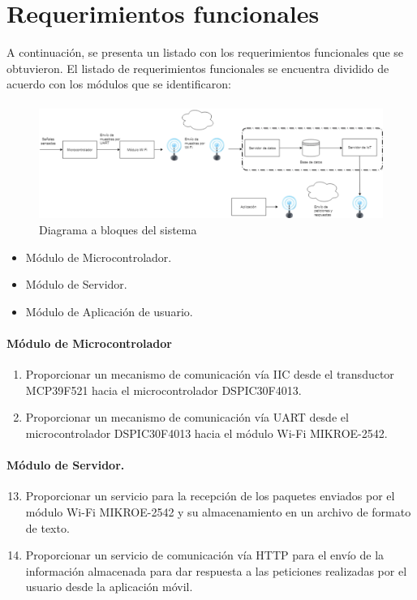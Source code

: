 \section{Requerimientos funcionales}
A continuación, se presenta un listado con los requerimientos funcionales que se obtuvieron.
El listado de requerimientos funcionales se encuentra dividido de acuerdo con los módulos que se identificaron:

\paragraph{}
\begin{figure}[H]
	\centering
	\includegraphics[scale=.3]{Capitulo3/img/diagramaBloques.png}
	\caption{Diagrama a bloques del sistema}
	\label{fig:diagrama_dispMonitoreo}
\end{figure}

\begin{itemize}
	\item Módulo de Microcontrolador.
	\item Módulo de Servidor.
	\item Módulo de Aplicación de usuario.
\end{itemize}

\paragraph{Módulo de Microcontrolador}
\begin{enumerate}[label=RF\arabic*.]
	\item Proporcionar un mecanismo de comunicación vía IIC desde el transductor MCP39F521 hacia el microcontrolador DSPIC30F4013.
	\item Proporcionar un mecanismo de comunicación vía UART desde el microcontrolador DSPIC30F4013 hacia el módulo Wi-Fi MIKROE-2542.
\end{enumerate}

\paragraph{Módulo de Servidor.}
\begin{enumerate}[label=RF\arabic*.]
	\setcounter{enumi}{12}
	\item Proporcionar un servicio para la recepción de los paquetes enviados por el módulo Wi-Fi MIKROE-2542 y su almacenamiento en un archivo de formato de texto.
	\item Proporcionar un servicio de comunicación vía HTTP para el envío de la información almacenada para dar respuesta a las peticiones realizadas por el usuario desde la aplicación móvil.  
\end{enumerate}

